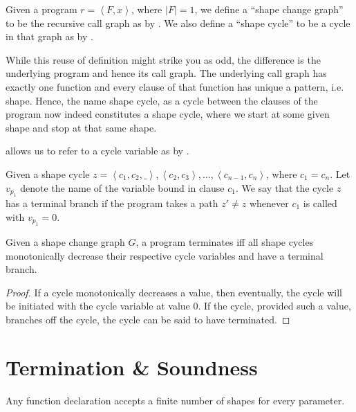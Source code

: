 \begin{definition}\label{definition:nice-4} Given a program $ r = \left\langle
F, x \right\rangle$, where $|F|=1$, we define a ``shape change graph'' to be
the recursive call graph as by . We
also define a ``shape cycle'' to be a cycle in that graph as by
.\end{definition}

While this reuse of definition might strike you as odd, the difference is the
underlying program and hence its call graph. The underlying call graph has
exactly one function and every clause of that function has unique a pattern,
i.e. shape. Hence, the name shape cycle, as a cycle between the clauses of the
program now indeed constitutes a shape cycle, where we start at some given
shape and stop at that same shape.

 allows us to refer to a cycle variable as by
.

\begin{definition} Given a shape cycle $z= \left\langle c_1,c_2,\_
\right\rangle, \left\langle c_2,c_3 \right\rangle, \ldots, \left\langle
c_{n-1}, c_n \right\rangle$, where $c_1=c_n$. Let $v_{p_1}$ denote the name of
the variable bound in clause $c_1$. We say that the cycle $z$ has a terminal
branch if the program takes a path $z'\neq z$ whenever $c_1$ is called with
$v_{p_1}=0$.\end{definition}

\begin{theorem} Given a shape change graph $G$, a program terminates iff all
shape cycles monotonically decrease their respective cycle
variables and have a terminal branch.\end{theorem}

\begin{proof} If a cycle monotonically decreases a value, then eventually, the
cycle will be initiated with the cycle variable at value $0$. If the cycle,
provided such a value, branches off the cycle, the cycle can be said to have
terminated.\end{proof}

\section{Termination \& Soundness}

\begin{lemma}\label{lemma:extend-function-finite-shape} Any function
declaration accepts a finite number of shapes for every parameter.\end{lemma}

